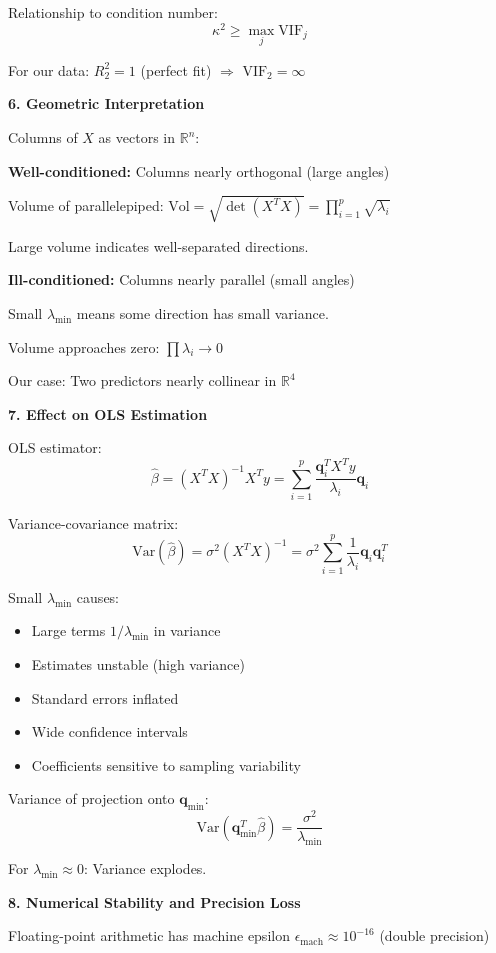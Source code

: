 \documentclass[12pt]{article}
\begin{document}
\begin{explanation}
Relationship to condition number:
\[\kappa^2 \geq \max_j \text{VIF}_j\]

For our data: $R_2^2 = 1$ (perfect fit) $\Rightarrow$ $\text{VIF}_2 = \infty$

\textbf{6. Geometric Interpretation}

Columns of $X$ as vectors in $\mathbb{R}^n$:

\textbf{Well-conditioned:} Columns nearly orthogonal (large angles)

Volume of parallelepiped: $\text{Vol} = \sqrt{\det(X^TX)} = \prod_{i=1}^{p} \sqrt{\lambda_i}$

Large volume indicates well-separated directions.

\textbf{Ill-conditioned:} Columns nearly parallel (small angles)

Small $\lambda_{\min}$ means some direction has small variance.

Volume approaches zero: $\prod \lambda_i \to 0$

Our case: Two predictors nearly collinear in $\mathbb{R}^4$

\textbf{7. Effect on OLS Estimation}

OLS estimator:
\[\hat{\beta} = (X^TX)^{-1}X^Ty = \sum_{i=1}^{p} \frac{\mathbf{q}_i^T X^T y}{\lambda_i} \mathbf{q}_i\]

Variance-covariance matrix:
\[\text{Var}(\hat{\beta}) = \sigma^2(X^TX)^{-1} = \sigma^2 \sum_{i=1}^{p} \frac{1}{\lambda_i} \mathbf{q}_i \mathbf{q}_i^T\]

Small $\lambda_{\min}$ causes:
\begin{itemize}
\item Large terms $1/\lambda_{\min}$ in variance
\item Estimates unstable (high variance)
\item Standard errors inflated
\item Wide confidence intervals
\item Coefficients sensitive to sampling variability
\end{itemize}

Variance of projection onto $\mathbf{q}_{\min}$:
\[\text{Var}(\mathbf{q}_{\min}^T \hat{\beta}) = \frac{\sigma^2}{\lambda_{\min}}\]

For $\lambda_{\min} \approx 0$: Variance explodes.

\textbf{8. Numerical Stability and Precision Loss}

Floating-point arithmetic has machine epsilon $\epsilon_{\text{mach}} \approx 10^{-16}$ (double precision)


\end{explanation}
\end{document}
